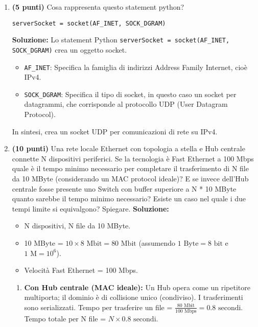 \documentclass[12pt,a4paper]{article}
\newcommand{\TT}[1]{\texttt{#1}}
\begin{document}
\begin{enumerate}[label=\textbf{\arabic*.}, wide, labelindent=0pt, leftmargin=*]
    \item \textbf{(5 punti)} Cosa rappresenta questo statement python?
    \begin{verbatim}
serverSocket = socket(AF_INET, SOCK_DGRAM)
    \end{verbatim}
    \textbf{Soluzione:}
    Lo statement Python \TT{serverSocket = socket(AF\_INET, SOCK\_DGRAM)} crea un oggetto socket.
    \begin{itemize}
        \item \TT{AF\_INET}: Specifica la famiglia di indirizzi Address Family Internet, cioè IPv4.
        \item \TT{SOCK\_DGRAM}: Specifica il tipo di socket, in questo caso un socket per datagrammi, che corrisponde al protocollo UDP (User Datagram Protocol).
    \end{itemize}
    In sintesi, crea un socket UDP per comunicazioni di rete su IPv4.

    \item \textbf{(10 punti)} Una rete locale Ethernet con topologia a stella e Hub centrale connette N dispositivi periferici. Se la tecnologia è Fast Ethernet a 100 Mbps quale è il tempo minimo necessario per completare il trasferimento di N file da 10 MByte (considerando un MAC protocol ideale)? E se invece dell'Hub centrale fosse presente uno Switch con buffer superiore a N * 10 MByte quanto sarebbe il tempo minimo necessario? Esiste un caso nel quale i due tempi limite si equivalgono? Spiegare.
    \newline\textbf{Soluzione:}
    \begin{itemize}
        \item N dispositivi, N file da 10 MByte.
        \item 10 MByte = $10 \times 8 \text{ Mbit} = 80 \text{ Mbit}$ (assumendo $1 \text{ Byte} = 8 \text{ bit}$ e $1 \text{ M} = 10^6$).
        \item Velocità Fast Ethernet = 100 Mbps.
    \end{itemize}
    \begin{enumerate}[label=\alph*), wide, labelindent=0pt, leftmargin=*]
        \item \textbf{Con Hub centrale (MAC ideale):}
        Un Hub opera come un ripetitore multiporta; il dominio è di collisione unico (condiviso). I trasferimenti sono serializzati.
        Tempo per trasferire un file = $\frac{80 \text{ Mbit}}{100 \text{ Mbps}} = 0.8 \text{ secondi}$.
        Tempo totale per N file = $N \times 0.8 \text{ secondi}$.


\end{enumerate}
\end{enumerate}
\end{document}

